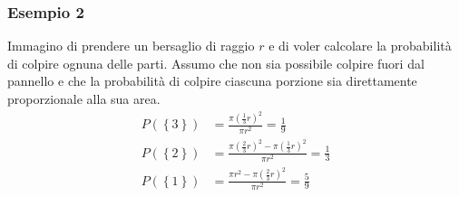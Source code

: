 \subsubsection*{Esempio 2}
Immagino di prendere un bersaglio di raggio $ r $ e di voler calcolare la probabilità di colpire ognuna delle parti. Assumo che non sia possibile colpire fuori dal pannello e che la probabilità di colpire ciascuna porzione sia direttamente proporzionale alla sua area.
\begin{align*}
	P\left(\left\{3\right\}\right) & = \frac{\pi \left(\frac{1}{3}r\right)^2}{\pi r^2} = \frac{1}{9}                                   \\
	P\left(\left\{2\right\}\right) & = \frac{\pi \left(\frac{2}{3}r\right)^2 - \pi \left(\frac{1}{3}r\right)^2}{\pi r^2} = \frac{1}{3} \\
	P\left(\left\{1\right\}\right) & = \frac{\pi r^2 - \pi \left(\frac{2}{3} r\right)^2 }{\pi r^2 } = \frac{5}{9}
\end{align*}

